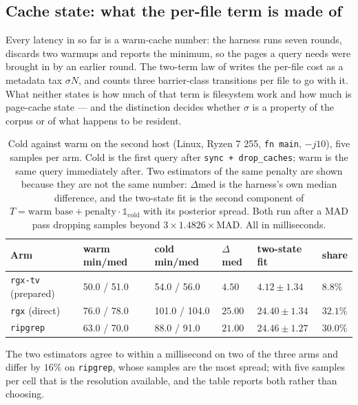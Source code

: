 \documentclass[11pt,letterpaper]{article}
\begin{document}
\subsection{Cache state: what the per-file term is made of}
\label{sec:eval:cold}
Every latency in  so far is a warm-cache number: the harness
runs seven rounds, discards two warmups and reports the minimum, so the
pages a query needs were brought in by an earlier round. The two-term law
of  writes the per-file cost as a metadata tax $\sigma N$,
and  counts three barrier-class transitions per file to go
with it. What neither states is how much of that term is filesystem work
and how much is page-cache state --- and the distinction decides whether
$\sigma$ is a property of the corpus or of what happens to be resident.

\begin{table}[htbp]
\centering
\footnotesize
\caption{Cold against warm on the second host (Linux, Ryzen 7 255,
\texttt{fn main}, $-j10$), five samples per arm. Cold is the first query
after \texttt{sync + drop\_caches}; warm is the same query immediately
after. Two estimators of the same penalty are shown because they are not
the same number: $\Delta$med is the harness's own median difference, and
the two-state fit is the second component of
$T = \text{warm base} + \text{penalty}\cdot\mathbb{1}_{\text{cold}}$ with
its posterior spread. Both run after a MAD pass dropping samples beyond
$3\times1.4826\times$MAD. All in milliseconds.}
\label{tab:cold}
\begin{tabular}{@{}llllll@{}}
\toprule
\textbf{Arm} & \textbf{warm min/med} & \textbf{cold min/med} &
  $\Delta$\textbf{med} & \textbf{two-state fit} & \textbf{share} \\
\midrule
\texttt{rgx-tv} (prepared) & 50.0 / 51.0 & 54.0 / 56.0
  & $4.50$ & $4.12 \pm 1.34$ & $8.8\%$ \\
\texttt{rgx} (direct)      & 76.0 / 78.0 & 101.0 / 104.0
  & $25.00$ & $24.40 \pm 1.34$ & $32.1\%$ \\
\texttt{ripgrep}           & 63.0 / 70.0 & 88.0 / 91.0
  & $21.00$ & $24.46 \pm 1.27$ & $30.0\%$ \\
\bottomrule
\end{tabular}
\end{table}

The two estimators agree to within a millisecond on two of the three arms
and differ by $16\%$ on \texttt{ripgrep}, whose samples are the most
spread; with five samples per cell that is the resolution available, and
the table reports both rather than choosing.
\end{document}
